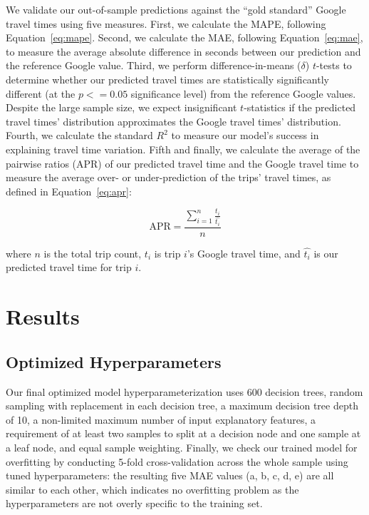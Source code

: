 \documentclass[12pt,letterpaper]{article} %
\begin{document}
    We validate our out-of-sample predictions against the \enquote{gold standard} Google travel times using five measures. First, we calculate the MAPE, following Equation~\ref{eq:mape}. Second, we calculate the MAE, following Equation~\ref{eq:mae}, to measure the average absolute difference in seconds between our prediction and the reference Google value. Third, we perform difference-in-means ($\delta$) $t$-tests to determine whether our predicted travel times are statistically significantly different (at the $p<=0.05$ significance level) from the reference Google values. Despite the large sample size, we expect insignificant $t$-statistics if the predicted travel times' distribution approximates the Google travel times' distribution. Fourth, we calculate the standard $R^2$ to measure our model's success in explaining travel time variation. Fifth and finally, we calculate the average of the pairwise ratios (APR) of our predicted travel time and the Google travel time to measure the average over- or under-prediction of the trips' travel times, as defined in Equation~\ref{eq:apr}:

    \begin{equation}
        \label{eq:apr}
        \text{APR} = \frac{\sum^{n}_{i=1}\frac{t_i}{\hat{t_i}}}{n}
    \end{equation}

    where $n$ is the total trip count, $t_i$ is trip $i$'s Google travel time, and $\hat{t_i}$ is our predicted travel time for trip $i$.

    \section{Results}

    \subsection{Optimized Hyperparameters}

    Our final optimized model hyperparameterization uses 600 decision trees, random sampling with replacement in each decision tree, a maximum decision tree depth of 10, a non-limited maximum number of input explanatory features, a requirement of at least two samples to split at a decision node and one sample at a leaf node, and equal sample weighting. Finally, we check our trained model for overfitting by conducting 5-fold cross-validation across the whole sample using tuned hyperparameters: the resulting five MAE values (a, b, c, d, e) are all similar to each other, which indicates no overfitting problem as the hyperparameters are not overly specific to the training set.
\end{document}
